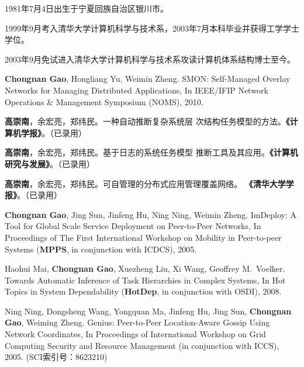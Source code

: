 \begin{resume}


  1981年7月4日出生于宁夏回族自治区银川市。

  1999年9月考入清华大学计算机科学与技术系，2003年7月本科毕业并获得工学学士学位。

  2003年9月免试进入清华大学计算机科学与技术系攻读计算机体系结构博士至今。


  \begin{enumerate}[{[}1{]}]

  \item \textbf{Chongnan Gao}, Hongliang Yu, Weimin Zheng.
  SMON: Self-Managed Overlay Networks for Managing Distributed
  Applications, In IEEE/IFIP Network Operations \& Management
  Symposium (NOMS), 2010.

  \item \textbf{高崇南}，余宏亮，郑纬民。一种自动推断复杂系统层
  次结构任务模型的方法。\textbf{《计算机学报》}。（已录用）

  \item \textbf{高崇南}，余宏亮，郑纬民。基于日志的系统任务模型
  推断工具及其应用。\textbf{《计算机研究与发展》}。（已录用）

  \item \textbf{高崇南}，余宏亮，郑纬民。可自管理的分布式应用管理覆盖网络。
  \textbf{《清华大学学报》}。（已录用）

  \item \textbf{Chongnan Gao}, Jing Sun, Jinfeng Hu, Ning Ning,
  Weimin Zheng.  ImDeploy: A Tool for Global Scale Service
  Deployment on Peer-to-Peer Networks, In Proceedings of The
  First International Workshop on Mobility in Peer-to-peer
  Systems (\textbf{MPPS}, in conjunction with ICDCS), 2005.

  \item Haohui Mai, \textbf{Chongnan Gao}, Xuezheng Liu, Xi
  Wang, Geoffrey M.\ Voelker. Towards Automatic Inference of
  Task Hierarchies in Complex Systems, In Hot Topics in System
  Dependability (\textbf{HotDep}, in conjunction with OSDI),
  2008.

  \item Ning Ning, Dongsheng Wang, Yongquan Ma, Jinfeng Hu, Jing Sun,
  \textbf{Chongnan Gao}, Weiming Zheng. Genius: Peer-to-Peer Location-Aware
  Gossip Using Network Coordinates, In Proceedings of International Workshop
  on Grid Computing Security and Resource Management (in conjunction with
  ICCS), 2005. (SCI索引号：8623210)


\end{enumerate}
\end{resume}
